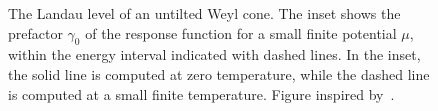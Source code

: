 \begin{figure}[htb]
  \centering
  
  \caption{The Landau level of an untilted Weyl cone.
    The inset shows the prefactor \( \gamma_0 \) of the response function for a small finite potential \( \mu \), within the energy interval indicated with dashed lines.
    In the inset, the solid line is computed at zero temperature, while the dashed line is computed at a small finite temperature.
    Figure inspired by~\textcite{arjonaFingerprintsConformalAnomaly2019}.
    }
    \label{fig:platau}
\end{figure}
